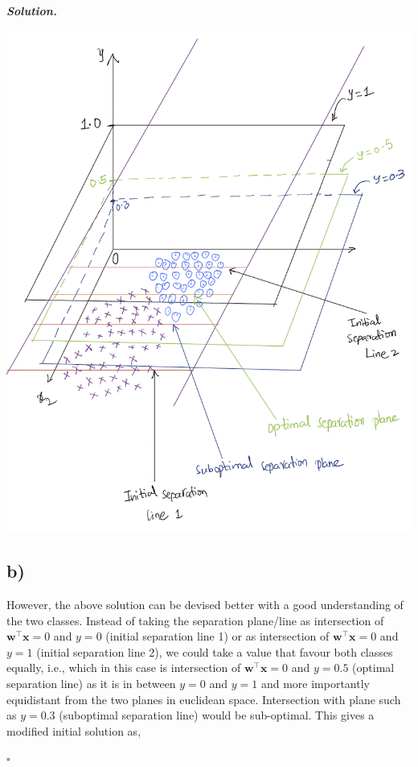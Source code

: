 \documentclass[10pt]{article}
\newenvironment{solution}[1][\it{Solution}]{\textbf{#1. } }{$\square$}
\begin{document}
\begin{solution}
\begin{center}
\includegraphics[width=16cm, keepaspectratio]{Problem2}
\end{center}

\subsection*{b)}

However, the above solution can be devised better with a good understanding of the two classes. Instead of taking the separation plane/line as intersection of $\mathbf{w}^{\top} \mathbf{x}=0$ and $y = 0$ (initial separation line 1) or as intersection of $\mathbf{w}^{\top} \mathbf{x}=0$ and $y = 1$ (initial separation line 2), we could take a value that favour both classes equally, i.e., which in this case is intersection of $\mathbf{w}^{\top} \mathbf{x}=0$ and $y = 0.5$ (optimal separation line) as it is in between $y = 0$ and $y = 1$ and more importantly equidistant from the two planes in euclidean space. Intersection with plane such as $y = 0.3$ (suboptimal separation line) would be sub-optimal. This gives a modified initial solution as,


\end{solution}
\end{document}
